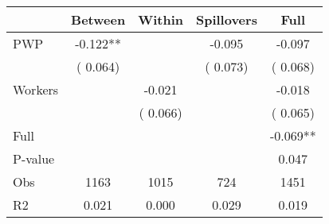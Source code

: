 
\begin{tabular}{l*{4}{c}}\hline&\multicolumn{1}{c}{Between}&\multicolumn{1}{c}{Within}&\multicolumn{1}{c}{Spillovers}&\multicolumn{1}{c}{Full}\\ \hline
 PWP           &             -0.122**      &                                               &       -0.095 &        -0.097                            \\ 
                               &        (       0.064)           &                                       &       (       0.073)     &      (       0.068)                                           \\ 
 Workers       &                                               &       -0.021    &                                &            -0.018                            \\ 
                               &                                               & (       0.066)                  &                                        &      (       0.065)                                           \\ 
\hline                                                                                                                                                                                                                                            
 Full                  &                                               &                                               &                                        &            -0.069**                                     \\ 
 P-value               &                                               &                                               &                                        &             0.047                                           \\ 
 Obs                   &               1163               &       1015                       &       724                &              1451                                               \\ 
 R2                    &                      0.021              &              0.000                      &              0.029               &                     0.019                                              \\ 
\hline \end{tabular}                                                                                                                                                                                                              